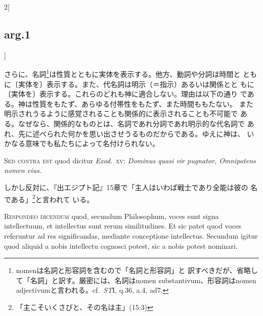 \documentclass[paper=a4paper,fontsize=10pt,jafontsize=9pt,titlepage]{jlreq}
\begin{document}
\begin{paracol}{2}[\subsection{arg.1}]
\switchcolumn

さらに、名詞\footnote{nomenは名詞と形容詞を含むので「名詞と形容詞」と
訳すべきだが、省略して「名詞」と訳す。厳密には、名詞はnomen
substantivum、形容詞はnomen adjectivumと言われる。cf.~{\itshape ST}I,
q.36, a.4, ad7.}は性質とともに実体を表示する。他方、動詞や分詞は時間と
ともに〔実体を〕表示する。また、代名詞は明示（＝指示）あるいは関係とと
もに〔実体を〕表示する。これらのどれも神に適合しない。理由は以下の通り
である。神は性質をもたず、あらゆる付帯性をもたず、また時間ももたない。
また明示されうるように感覚されることも関係的に表示されることも不可能で
ある。なぜなら、関係的なものとは、名詞であれ分詞であれ明示的な代名詞で
あれ、先に述べられた何かを思い出させうるものだからである。ゆえに神は、
いかなる意味でも私たちによって名付けられない。

\switchcolumn*[\subsection{s.c.}]

{\scshape Sed contra est} quod dicitur {\itshape Exod}.\ {\scshape xv}: {\itshape Dominus
quasi vir pugnator, Omnipotens nomen eius}.

\switchcolumn

しかし反対に、『出エジプト記』15章で「主人はいわば戦士であり全能は彼の
名である」\footnote{「主こそいくさびと、その名は主」(15:3)}と言われて
いる。


{\scshape Respondeo dicendum} quod, secundum Philosophum, voces sunt signa
intellectuum, et intellectus sunt rerum similitudines. Et sic patet
quod voces referuntur ad res significandas, mediante conceptione
intellectus. Secundum igitur quod aliquid a nobis intellectu cognosci
potest, sic a nobis potest nominari.

\switchcolumn


\end{paracol}
\end{document}
